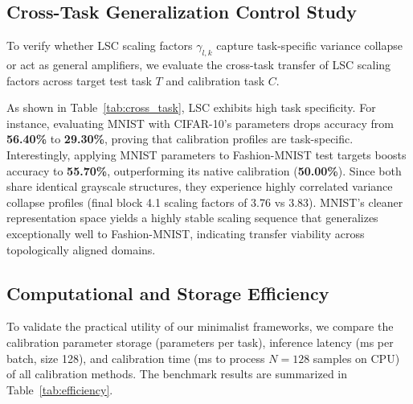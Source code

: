 \documentclass{article}
\theoremstyle{plain}
\theoremstyle{definition}
\theoremstyle{remark}
\begin{document}
\subsection{Cross-Task Generalization Control Study}\enlargethispage{3\baselineskip}
\label{sec:cross_task}
To verify whether LSC scaling factors $\gamma_{l,k}$ capture task-specific variance collapse or act as general amplifiers, we evaluate the cross-task transfer of LSC scaling factors across target test task $T$ and calibration task $C$.

As shown in Table~\ref{tab:cross_task}, LSC exhibits high task specificity. For instance, evaluating MNIST with CIFAR-10's parameters drops accuracy from \textbf{56.40\%} to \textbf{29.30\%}, proving that calibration profiles are task-specific. Interestingly, applying MNIST parameters to Fashion-MNIST test targets boosts accuracy to \textbf{55.70\%}, outperforming its native calibration (\textbf{50.00\%}). Since both share identical grayscale structures, they experience highly correlated variance collapse profiles (final block 4.1 scaling factors of 3.76 vs 3.83). MNIST's cleaner representation space yields a highly stable scaling sequence that generalizes exceptionally well to Fashion-MNIST, indicating transfer viability across topologically aligned domains.

\subsection{Computational and Storage Efficiency}\enlargethispage{3\baselineskip}
\label{sec:efficiency}
To validate the practical utility of our minimalist frameworks, we compare the calibration parameter storage (parameters per task), inference latency (ms per batch, size 128), and calibration time (ms to process $N=128$ samples on CPU) of all calibration methods. The benchmark results are summarized in Table~\ref{tab:efficiency}.
\end{document}
